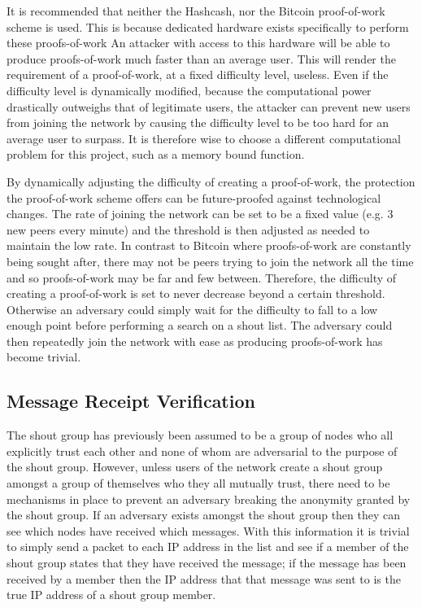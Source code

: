 \documentclass[ %
                    author={Luke Murray},
                supervisor={Dr. Simon Hollis},
                     title={Shadow Peer-to-Peer Networks},
                  subtitle={},
                    degree={MEng},
                      year={2013} ]{thesis}
\begin{document}
It is recommended that neither the Hashcash, nor the Bitcoin proof-of-work scheme is used. This is because dedicated hardware exists specifically to perform these proofs-of-work\cite{avalonasic} An attacker with access to this hardware will be able to produce proofs-of-work much faster than an average user. This will render the requirement of a proof-of-work, at a fixed difficulty level, useless. Even if the difficulty level is dynamically modified, because the computational power drastically outweighs that of legitimate users, the attacker can prevent new users from joining the network by causing the difficulty level to be too hard for an average user to surpass. It is therefore wise to choose a different computational problem for this project, such as a memory bound function\cite{abadi2005moderately}.

By dynamically adjusting the difficulty of creating a proof-of-work, the protection the proof-of-work scheme offers can be future-proofed against technological changes. The rate of joining the network can be set to be a fixed value (e.g. 3 new peers every minute) and the threshold is then adjusted as needed to maintain the low rate. In contrast to Bitcoin where proofs-of-work are constantly being sought after, there may not be peers trying to join the network all the time and so proofs-of-work may be far and few between. Therefore, the difficulty of creating a proof-of-work is set to never decrease beyond a certain threshold. Otherwise an adversary could simply wait for the difficulty to fall to a low enough point before performing a search on a shout list. The adversary could then repeatedly join the network with ease as producing proofs-of-work has become trivial.

\subsection{Message Receipt Verification}

The shout group has previously been assumed to be a group of nodes who all explicitly trust each other and none of whom are adversarial to the purpose of the shout group. However, unless users of the network create a shout group amongst a group of themselves who they all mutually trust, there need to be mechanisms in place to prevent an adversary breaking the anonymity granted by the shout group. If an adversary exists amongst the shout group then they can see which nodes have received which messages. With this information it is trivial to simply send a packet to each IP address in the list and see if a member of the shout group states that they have received the message; if the message has been received by a member then the IP address that that message was sent to is the true IP address of a shout group member.
\end{document}
